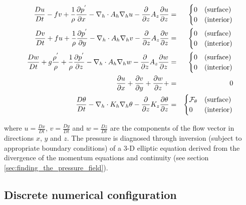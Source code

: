 \begin{eqnarray}
\label{eq:eg-bconv-model_equations}
\frac{Du}{Dt} - fv + 
  \frac{1}{\rho}\frac{\partial p^{'}}{\partial x} - 
  \nabla_{h}\cdot A_{h}\nabla_{h}u - 
  \frac{\partial}{\partial z}A_{z}\frac{\partial u}{\partial z} 
 & = &
\begin{cases}
0 & \text{(surface)} \\
0 & \text{(interior)}
\end{cases}
\\
\frac{Dv}{Dt} + fu + 
  \frac{1}{\rho}\frac{\partial p^{'}}{\partial y} - 
  \nabla_{h}\cdot A_{h}\nabla_{h}v - 
  \frac{\partial}{\partial z}A_{z}\frac{\partial v}{\partial z} 
& = &
\begin{cases}
0 & \text{(surface)} \\
0 & \text{(interior)}
\end{cases}
\\
\frac{Dw}{Dt} + g \frac{\rho^{'}}{\rho} + 
  \frac{1}{\rho}\frac{\partial p^{'}}{\partial z} - 
  \nabla_{h}\cdot A_{h}\nabla_{h}w - 
  \frac{\partial}{\partial z}A_{z}\frac{\partial w}{\partial z} 
& = &
\begin{cases}
0 & \text{(surface)} \\
0 & \text{(interior)}
\end{cases}
\\
\frac{\partial u}{\partial x} + 
\frac{\partial v}{\partial y} + 
\frac{\partial w}{\partial z} + 
&=&
0
\\
\frac{D\theta}{Dt} -
 \nabla_{h}\cdot K_{h}\nabla_{h}\theta
 - \frac{\partial}{\partial z}K_{z}\frac{\partial\theta}{\partial z} 
& = &
\begin{cases}
{\cal F}_\theta & \text{(surface)} \\
0 & \text{(interior)}
\end{cases}
\label{eq:eg-bconv-theta_equations}
\end{eqnarray}

\noindent where $u=\frac{Dx}{Dt}$, $v=\frac{Dy}{Dt}$  and 
$w=\frac{Dz}{Dt}$ are the components of the
flow vector in directions $x$, $y$ and $z$. 
The pressure is diagnosed through inversion (subject to appropriate boundary
conditions) of a 3-D elliptic equation derived from the divergence of the momentum 
equations and continuity (see section \ref{sec:finding_the_pressure_field}).
\\

\subsection{Discrete numerical configuration}

